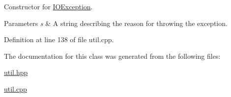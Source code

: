 \-Constructor for \hyperlink{classLibWheel_1_1IOException}{\-I\-O\-Exception}. 


\begin{DoxyParams}{\-Parameters}
{\em s} & \-A string describing the reason for throwing the exception. \\
\hline
\end{DoxyParams}


\-Definition at line 138 of file util.\-cpp.



\-The documentation for this class was generated from the following files\-:\begin{DoxyCompactItemize}
\item 
\hyperlink{util_8hpp}{util.\-hpp}\item 
\hyperlink{util_8cpp}{util.\-cpp}\end{DoxyCompactItemize}
